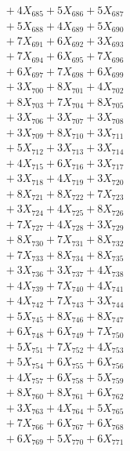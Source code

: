 \documentclass[a4paper,10pt]{article}
\begin{document}
{\begin{align}
&\;  + 4 X_{685} + 5 X_{686} + 5 X_{687} \\[0.3ex]
&\;  + 5 X_{688} + 4 X_{689} + 5 X_{690} \\[0.3ex]
&\;  + 7 X_{691} + 6 X_{692} + 3 X_{693} \\[0.3ex]
&\;  + 7 X_{694} + 6 X_{695} + 7 X_{696} \\[0.3ex]
&\;  + 6 X_{697} + 7 X_{698} + 6 X_{699} \\[0.5ex]\allowbreak
&\;  + 3 X_{700} + 8 X_{701} + 4 X_{702} \\[0.3ex]
&\;  + 8 X_{703} + 7 X_{704} + 8 X_{705} \\[0.3ex]
&\;  + 3 X_{706} + 3 X_{707} + 3 X_{708} \\[0.3ex]
&\;  + 3 X_{709} + 8 X_{710} + 3 X_{711} \\[0.3ex]
&\;  + 5 X_{712} + 3 X_{713} + 3 X_{714} \\[0.3ex]
&\;  + 4 X_{715} + 6 X_{716} + 3 X_{717} \\[0.3ex]
&\;  + 3 X_{718} + 4 X_{719} + 3 X_{720} \\[0.3ex]
&\;  + 8 X_{721} + 8 X_{722} + 7 X_{723} \\[0.3ex]
&\;  + 3 X_{724} + 4 X_{725} + 8 X_{726} \\[0.3ex]
&\;  + 7 X_{727} + 4 X_{728} + 3 X_{729} \\[0.5ex]\allowbreak
&\;  + 8 X_{730} + 7 X_{731} + 8 X_{732} \\[0.3ex]
&\;  + 7 X_{733} + 8 X_{734} + 8 X_{735} \\[0.3ex]
&\;  + 3 X_{736} + 3 X_{737} + 4 X_{738} \\[0.3ex]
&\;  + 4 X_{739} + 7 X_{740} + 4 X_{741} \\[0.3ex]
&\;  + 4 X_{742} + 7 X_{743} + 3 X_{744} \\[0.3ex]
&\;  + 5 X_{745} + 8 X_{746} + 8 X_{747} \\[0.3ex]
&\;  + 6 X_{748} + 6 X_{749} + 7 X_{750} \\[0.3ex]
&\;  + 5 X_{751} + 7 X_{752} + 4 X_{753} \\[0.3ex]
&\;  + 5 X_{754} + 6 X_{755} + 6 X_{756} \\[0.3ex]
&\;  + 4 X_{757} + 6 X_{758} + 5 X_{759} \\[0.5ex]\allowbreak
&\;  + 8 X_{760} + 8 X_{761} + 6 X_{762} \\[0.3ex]
&\;  + 3 X_{763} + 4 X_{764} + 5 X_{765} \\[0.3ex]
&\;  + 7 X_{766} + 6 X_{767} + 6 X_{768} \\[0.3ex]
&\;  + 6 X_{769} + 5 X_{770} + 6 X_{771} \\[0.3ex]

\end{align}}
\end{document}
